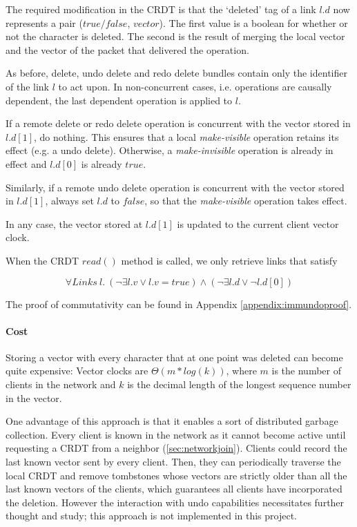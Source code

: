 \documentclass[12pt,a4paper,twoside,openright]{report}
\begin{document}
			The required modification in the CRDT is that the `deleted' tag of a link $l.d$ now represents a pair ($true/false$, $vector$). The first value is a boolean for whether or not the character is deleted. The second is the result of merging the local vector and the vector of the packet that delivered the operation.
			
			As before, delete, undo delete and redo delete bundles contain only the identifier of the link $l$ to act upon. In non-concurrent cases, i.e. operations are causally dependent, the last dependent operation is applied to $l$. 
			
			If a remote delete or redo delete operation is concurrent with the vector stored in $l.d[1]$, do nothing. This ensures that a local \textit{make-visible} operation retains its effect (e.g. a undo delete). Otherwise, a \textit{make-invisible} operation is already in effect and $l.d[0]$ is already $true$.
			
			Similarly, if a remote undo delete operation is concurrent with the vector stored in $l.d[1]$, always set $l.d$ to $false$, so that the \textit{make-visible} operation takes effect.
			
			In any case, the vector stored at $l.d[1]$ is updated to the current client vector clock.
			
			When the CRDT $read()$ method is called, we only retrieve links that satisfy
			
					\[\forall Links\ l.\  (\lnot\exists l.v \lor l.v = true) \land (\lnot\exists l.d \lor \lnot l.d[0]) \] 
						
			The proof of commutativity can be found in Appendix \ref{appendix:immundoproof}.
			
			
			
			
			
			\paragraph{Cost}
			Storing a vector with every character that at one point was deleted can become quite expensive: Vector clocks are $\Theta (m*log(k))$, where $m$ is the number of clients in the network and $k$ is the decimal length of the longest sequence number in the vector.
			
			One advantage of this approach is that it enables a sort of distributed garbage collection. Every client is known in the network as it cannot become active until requesting a CRDT from a neighbor (\cref{sec:networkjoin}). Clients could record the last known vector sent by every client. Then, they can periodically traverse the local CRDT and remove tombstones whose vectors are strictly older than all the last known vectors of the clients, which guarantees all clients have incorporated the deletion. However the interaction with undo capabilities necessitates further thought and study; this approach is not implemented in this project.
			
\end{document}
